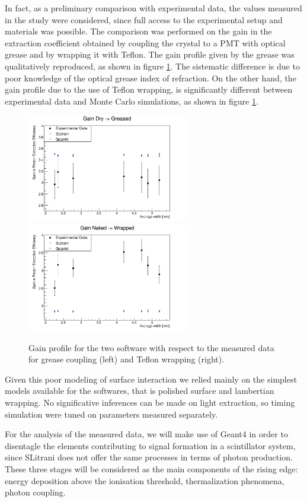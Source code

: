 In fact, as a preliminary comparison with experimental data, the values measured in the study \cite{Kris2012} were considered, since full access to the experimental setup and materials was possible. 
The comparison was performed on the gain in the extraction coefficient obtained by coupling the crystal to a PMT with optical grease and by wrapping it with Teflon.
The gain profile given by the grease was qualitatively reproduced, as shown in figure \ref{fig:gain}. The sistematic difference is due to poor knowledge of the optical grease index of refraction. 
On the other hand, the gain profile due to the use of
Teflon wrapping, is significantly different between
experimental data and Monte Carlo simulations, as shown in figure \ref{fig:gain}.
\begin{figure}[htbp]
\begin{center}
\includegraphics[width=7cm]{../Pictures/Chapter_5/gain_grease.png}
\includegraphics[width=7cm]{../Pictures/Chapter_5/wrap_gain.png}
\end{center}
\caption[Geant4 SLitrani gain profiles]{Gain profile for the two software with respect to the measured data for grease coupling (left) and Teflon wrapping (right).}
\label{fig:gain}
\end{figure}
Given this poor modeling of surface interaction we relied mainly on the simplest models available for the softwares, that is polished surface and lambertian wrapping. No significative inferences can be made on light extraction, so timing simulation were tuned on parameters measured separately.

For the analysis of the measured data, we will make use of Geant4 in order to disentagle the elements contributing to signal formation in a scintillator system, since SLitrani does not offer the same processes in terms of photon production.
These three stages will be considered as the main components of the rising edge: energy deposition above the ionisation threshold, thermalization phenomena, photon coupling.

